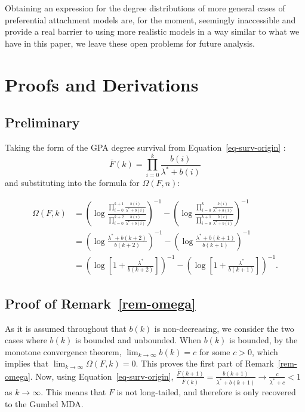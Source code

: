 \documentclass[
  sn-basic,
  10pt,
]{sn-jnl}
\theoremstyle{thmstyleone}
\theoremstyle{thmstyleone}
\theoremstyle{remark}
\theoremstyle{plain}
\theoremstyle{plain}
\theoremstyle{remark}
\begin{document}
Obtaining an expression for the degree distributions of more general
cases of preferential attachment models are, for the moment, seemingly
inaccessible and provide a real barrier to using more realistic models
in a way similar to what we have in this paper, we leave these open
problems for future analysis.

\setcounter{section}{0}
\renewcommand{\thesection}{\Alph{section}}
\setcounter{table}{0}
\renewcommand{\thetable}{A\arabic{table}}
\setcounter{figure}{0}
\renewcommand{\thefigure}{A\arabic{figure}}

\newpage

\section{Proofs and Derivations}\label{sec-proofs}

\subsection{Preliminary}\label{preliminary}

Taking the form of the GPA degree survival from
Equation~\ref{eq-surv-origin} : \[
\bar F(k) = \prod_{i=0}^k\frac{b(i)}{\lambda^*+b(i)}
\] and substituting into the formula for \(\Omega(F,n)\):

\begin{align*}
\Omega(F,k)&=\left(\log\frac{\prod_{i=0}^{k+1}\frac{b(i)}{\lambda^{*}+b(i)}}{\prod_{i=0}^{k+2}\frac{b(i)}{\lambda^{*}+b(i)}}\right)^{-1}-\left(\log\frac{\prod_{i=0}^{k}\frac{b(i)}{\lambda^{*}+b(i)}}{\prod_{i=0}^{k+1}\frac{b(i)}{\lambda^{*}+b(i)}}\right)^{-1}\\
&=\left(\log\frac{\lambda^{*}+b(k+2)}{b(k+2)}\right)^{-1}-\left(\log\frac{\lambda^{*}+b(k+1)}{b(k+1)}\right)^{-1}\\
&=\left(\log\left[1+\frac{\lambda^{*}}{b(k+2)}\right]\right)^{-1}-\left(\log\left[1+\frac{\lambda^{*}}{b(k+1)}\right]\right)^{-1}.
\end{align*}

\subsection{\texorpdfstring{Proof of
Remark~\ref{rem-omega}}{Proof of Remark~}}\label{proof-of-rem-omega}

As it is assumed throughout that \(b(k)\) is non-decreasing, we consider
the two cases where \(b(k)\) is bounded and unbounded. When \(b(k)\) is
bounded, by the monotone convergence theorem,
\(\lim_{k\rightarrow\infty}b(k) = c\) for some \(c>0\), which implies
that \(\lim_{k\rightarrow\infty}\Omega(F,k)= 0\). This proves the first
part of Remark~\ref{rem-omega}. Now, using
Equation~\ref{eq-surv-origin},
\(\frac{\bar{F}(k+1)}{\bar{F}(k)}=\frac{b(k+1)}{\lambda^{*}+b(k+1)}\rightarrow\frac{c}{\lambda^{*}+c}<1\)
as \(k\rightarrow\infty\). This means that \(F\) is not long-tailed, and
therefore is only recovered to the Gumbel MDA.
\end{document}
